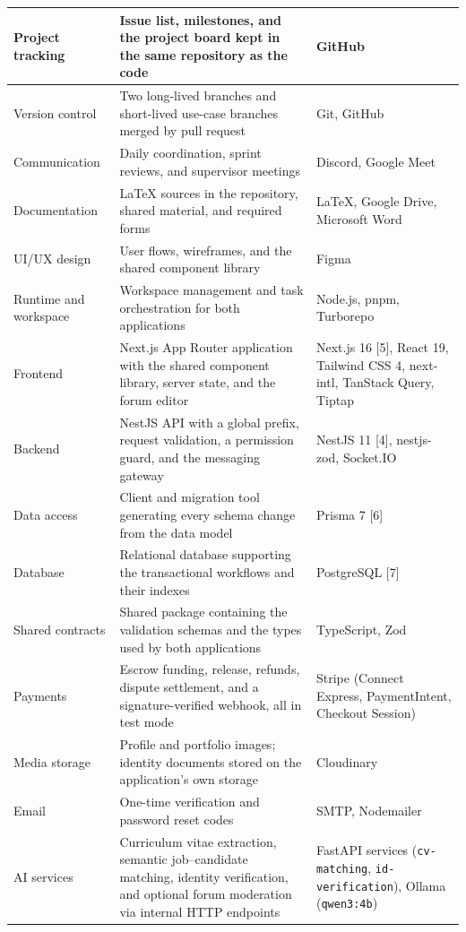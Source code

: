 \begin{longtable}{|L{3.1cm}|L{6.3cm}|L{4.9cm}|}
Project tracking & Issue list, milestones, and the project board kept in the same repository as the code & GitHub \\ \hline
Version control & Two long-lived branches and short-lived use-case branches merged by pull request & Git, GitHub \\ \hline
Communication & Daily coordination, sprint reviews, and supervisor meetings & Discord, Google Meet \\ \hline
Documentation & LaTeX sources in the repository, shared material, and required forms & LaTeX, Google Drive, Microsoft Word \\ \hline
UI/UX design & User flows, wireframes, and the shared component library & Figma \\ \hline
Runtime and workspace & Workspace management and task orchestration for both applications & Node.js, pnpm, Turborepo \\ \hline
Frontend & Next.js App Router application with the shared component library, server state, and the forum editor & Next.js 16 [5], React 19, Tailwind CSS 4, next-intl, TanStack Query, Tiptap \\ \hline
Backend & NestJS API with a global prefix, request validation, a permission guard, and the messaging gateway & NestJS 11 [4], nestjs-zod, Socket.IO \\ \hline
Data access & Client and migration tool generating every schema change from the data model & Prisma 7 [6] \\ \hline
Database & Relational database supporting the transactional workflows and their indexes & PostgreSQL [7] \\ \hline
Shared contracts & Shared package containing the validation schemas and the types used by both applications & TypeScript, Zod \\ \hline
Payments & Escrow funding, release, refunds, dispute settlement, and a signature-verified webhook, all in test mode & Stripe (Connect Express, PaymentIntent, Checkout Session) \\ \hline
Media storage & Profile and portfolio images; identity documents stored on the application's own storage & Cloudinary \\ \hline
Email & One-time verification and password reset codes & SMTP, Nodemailer \\ \hline
AI services & Curriculum vitae extraction, semantic job--candidate matching, identity verification, and optional forum moderation via internal HTTP endpoints & FastAPI services (\texttt{cv-matching}, \texttt{id-verification}), Ollama (\texttt{qwen3:4b}) \\ \hline

\end{longtable}
